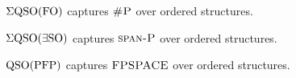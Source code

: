 \begin{theorem} \label{eqso-fo-cap}
	$\Sigma{\rm QSO}({\rm FO})$ captures $\text{\sc \#P}$ over ordered structures.
\end{theorem}

\begin{theorem} \label{eqso-eso-cap}
	$\Sigma{\rm QSO}(\exists{\rm SO})$ captures $\text{\sc span-P}$ over ordered structures.
\end{theorem}

\begin{theorem} \label{qso-pfp-cap}
	${\rm QSO}({\rm PFP})$ captures $\text{\sc FPSPACE}$ over ordered structures.
\end{theorem}

